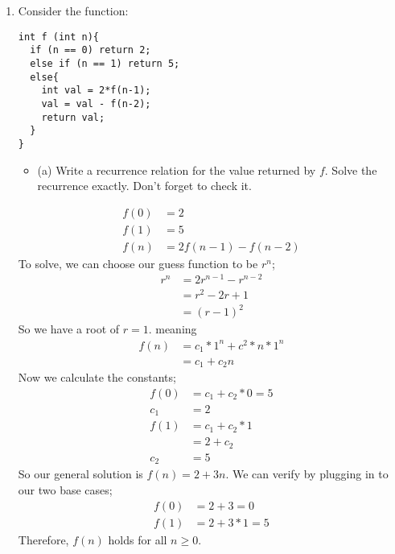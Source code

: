 \documentclass{article}
\begin{document}
\begin{enumerate}
\item Consider the function:
\begin{verbatim}
int f (int n){
  if (n == 0) return 2;
  else if (n == 1) return 5;
  else{
    int val = 2*f(n-1);
    val = val - f(n-2);
    return val;
  }
}
\end{verbatim}
\begin{itemize}
    \item (a) Write a recurrence relation for the value returned by $f$. Solve the recurrence exactly. Don't forget to check it.
\end{itemize}
\begin{align*}
    f(0) & = 2 \\
    f(1) & = 5 \\
    f(n) & = 2f(n-1) - f(n-2)
\end{align*}
To solve, we can choose our guess function to be $r^{n}$;
\begin{align*}
    r^{n} & = 2r^{n-1}-r^{n-2} \\
    & = r^2 - 2r + 1 \\
    & = (r-1)^{2}
\end{align*}
So we have a root of $r=1$. meaning
\begin{align*}
    f(n) & = c_1 * 1^{n} + c^2 * n * 1^{n} \\
    & = c_1 + c_2 n
\end{align*}
Now we calculate the constants;
\begin{align*}
    f(0) & = c_1 + c_2 * 0 = 5 \\
    c_1 & = 2 \\
    f(1) & = c_1 + c_2 * 1 \\
    & = 2 + c_2 \\
    c_2 & = 5
\end{align*}
So our general solution is $f(n) = 2 + 3n$. We can verify by plugging in to our two base cases;
\begin{align*}
    f(0) & = 2 + 3 = 0 \\
    f(1) & = 2 + 3 * 1 = 5
\end{align*}
Therefore, $f(n)$ holds for all $n \geq 0$.





\end{enumerate}
\end{document}
